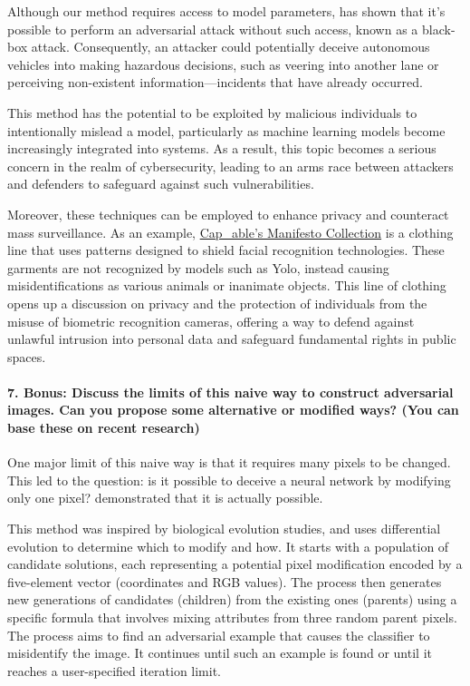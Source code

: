 Although our method requires access to model parameters, \cite{athalye2018synthesizing} has shown that it's possible to perform an adversarial attack without such access, known as a black-box attack. Consequently, an attacker could potentially deceive autonomous vehicles into making hazardous decisions, such as veering into another lane or perceiving non-existent information—incidents that have already occurred. 

This method has the potential to be exploited by malicious individuals to intentionally mislead a model, particularly as machine learning models become increasingly integrated into systems. As a result, this topic becomes a serious concern in the realm of cybersecurity, leading to an arms race between attackers and defenders to safeguard against such vulnerabilities.

Moreover, these techniques can be employed to enhance privacy and counteract mass surveillance. As an example, \href{https://www.capable.design}{Cap\_able's Manifesto Collection} is a clothing line that uses patterns designed to shield facial recognition technologies. These garments are not recognized by models such as Yolo, instead causing misidentifications as various animals or inanimate objects. This line of clothing opens up a discussion on privacy and the protection of individuals from the misuse of biometric recognition cameras, offering a way to defend against unlawful intrusion into personal data and safeguard fundamental rights in public spaces. 

\paragraph*{7. \textbf{Bonus:} Discuss the limits of this naive way to construct adversarial images. Can you propose some alternative or modiﬁed ways? (You can base these on recent research)}

One major limit of this naive way is that it requires many pixels to be changed. This led to the question: is it possible to deceive a neural network by modifying only one pixel? \cite{Su_2019} demonstrated that it is actually possible.

This method was inspired by biological evolution studies, and uses differential evolution to determine which to modify and how. It starts with a population of candidate solutions, each representing a potential pixel modification encoded by a five-element vector (coordinates and RGB values). The process then generates new generations of candidates (children) from the existing ones (parents) using a specific formula that involves mixing attributes from three random parent pixels. The process aims to find an adversarial example that causes the classifier to misidentify the image. It continues until such an example is found or until it reaches a user-specified iteration limit.

